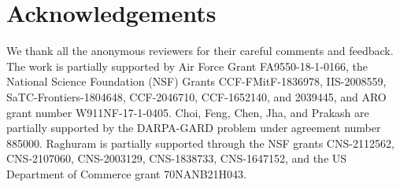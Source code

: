 \documentclass[nohyperref]{article}
\begin{document}
\printAffiliationsAndNotice{}  %












% 



\section*{Acknowledgements}
We thank all the anonymous reviewers for their careful comments and feedback.
The work is partially supported by Air Force Grant FA9550-18-1-0166, the National Science Foundation (NSF) Grants CCF-FMitF-1836978, IIS-2008559, SaTC-Frontiers-1804648, CCF-2046710, CCF-1652140, and 2039445, and ARO grant number W911NF-17-1-0405. Choi, Feng, Chen, Jha, and Prakash are partially supported by the DARPA-GARD problem under agreement number 885000.
Raghuram is partially supported through the NSF grants CNS-2112562, CNS-2107060, CNS-2003129, CNS-1838733, CNS-1647152, and the US Department of Commerce grant 70NANB21H043.




% 


\end{document}
